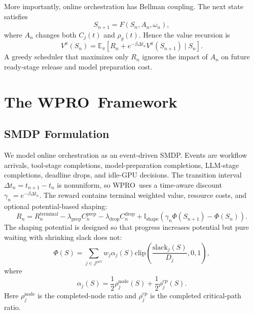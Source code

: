 \documentclass[10pt,conference]{IEEEtran}
\newcommand{\WPRO}{\textsc{WPRO}}
\newcommand{\calJ}{\mathcal{J}}
\newcommand{\ind}{\mathbb{I}}
\begin{document}
More importantly, online orchestration has Bellman coupling. The next state satisfies
\begin{equation}
S_{n+1}=F(S_n,A_n,\omega_n),
\end{equation}
where \(A_n\) changes both \(C_j(t)\) and \(\rho_g(t)\). Hence the value recursion is
\begin{equation}
V^{\pi}(S_n)=\mathbb{E}_{\pi}\left[R_n + e^{-\beta\Delta t_n}V^{\pi}(S_{n+1})\mid S_n\right].
\end{equation}
A greedy scheduler that maximizes only \(R_n\) ignores the impact of \(A_n\) on future ready-stage release and model preparation cost.

\section{The \WPRO\ Framework}

\subsection{SMDP Formulation}

We model online orchestration as an event-driven SMDP. Events are workflow arrivals, tool-stage completions, model-preparation completions, LLM-stage completions, deadline drops, and idle-GPU decisions. The transition interval \(\Delta t_n=t_{n+1}-t_n\) is nonuniform, so \WPRO\ uses a time-aware discount \(\gamma_n=e^{-\beta\Delta t_n}\). The reward contains terminal weighted value, resource costs, and optional potential-based shaping:
\begin{equation}
R_n=R_n^{\mathrm{terminal}}-\lambda_{\mathrm{prep}}C_n^{\mathrm{prep}}
-\lambda_{\mathrm{drop}}C_n^{\mathrm{drop}}+
\ind_{\mathrm{shape}}\left(\gamma_n\Phi(S_{n+1})-\Phi(S_n)\right).
\end{equation}
The shaping potential is designed so that progress increases potential but pure waiting with shrinking slack does not:
\begin{equation}
\Phi(S)=\sum_{j\in\calJ^{\mathrm{act}}} w_j \alpha_j(S)
\mathrm{clip}\left(\frac{\mathrm{slack}_j(S)}{D_j},0,1\right),
\end{equation}
where
\begin{equation}
\alpha_j(S)=\frac{1}{2}\rho_j^{\mathrm{node}}(S)+
\frac{1}{2}\rho_j^{\mathrm{cp}}(S).
\end{equation}
Here \(\rho_j^{\mathrm{node}}\) is the completed-node ratio and \(\rho_j^{\mathrm{cp}}\) is the completed critical-path ratio.
\end{document}
